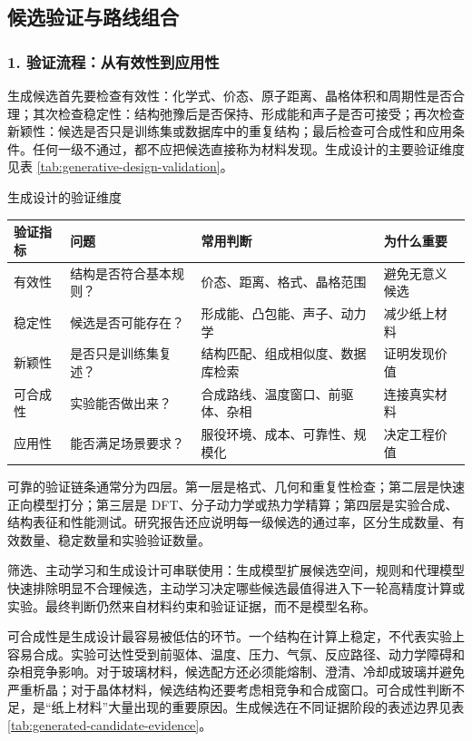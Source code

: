 \subsection{候选验证与路线组合}

\subsubsection*{\textbf{1. 验证流程：从有效性到应用性}}

生成候选首先要检查有效性：化学式、价态、原子距离、晶格体积和周期性是否合理；其次检查稳定性：结构弛豫后是否保持、形成能和声子是否可接受；再次检查新颖性：候选是否只是训练集或数据库中的重复结构；最后检查可合成性和应用条件。任何一级不通过，都不应把候选直接称为材料发现。生成设计的主要验证维度见表 \ref{tab:generative-design-validation}。


\begin{formalTable}[htbp]
\caption{生成设计的验证维度}
\label{tab:generative-design-validation}
\begin{tabularx}{\textwidth}{@{}YYYY@{}}
\toprule
\textbf{验证指标} & \textbf{问题} & \textbf{常用判断} & \textbf{为什么重要} \\
\midrule
有效性 & 结构是否符合基本规则？ & 价态、距离、格式、晶格范围 & 避免无意义候选 \\
稳定性 & 候选是否可能存在？ & 形成能、凸包能、声子、动力学 & 减少纸上材料 \\
新颖性 & 是否只是训练集复述？ & 结构匹配、组成相似度、数据库检索 & 证明发现价值 \\
可合成性 & 实验能否做出来？ & 合成路线、温度窗口、前驱体、杂相 & 连接真实材料 \\
应用性 & 能否满足场景要求？ & 服役环境、成本、可靠性、规模化 & 决定工程价值 \\
\bottomrule
\end{tabularx}
\end{formalTable}

可靠的验证链条通常分为四层。第一层是格式、几何和重复性检查；第二层是快速正向模型打分；第三层是 DFT、分子动力学或热力学精算；第四层是实验合成、结构表征和性能测试。研究报告还应说明每一级候选的通过率，区分生成数量、有效数量、稳定数量和实验验证数量。


筛选、主动学习和生成设计可串联使用：生成模型扩展候选空间，规则和代理模型快速排除明显不合理候选，主动学习决定哪些候选最值得进入下一轮高精度计算或实验。最终判断仍然来自材料约束和验证证据，而不是模型名称。

可合成性是生成设计最容易被低估的环节。一个结构在计算上稳定，不代表实验上容易合成。实验可达性受到前驱体、温度、压力、气氛、反应路径、动力学障碍和杂相竞争影响。对于玻璃材料，候选配方还必须能熔制、澄清、冷却成玻璃并避免严重析晶；对于晶体材料，候选结构还要考虑相竞争和合成窗口。可合成性判断不足，是“纸上材料”大量出现的重要原因。生成候选在不同证据阶段的表述边界见表 \ref{tab:generated-candidate-evidence}。

